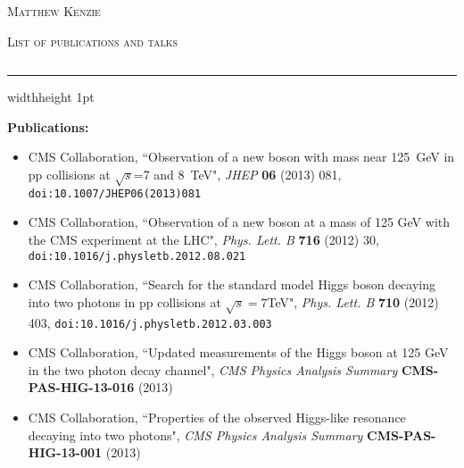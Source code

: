 \documentclass[11pt]{article}
\begin{document}
\pagestyle{fancy}
\fancyhead{}
\renewcommand{\headrulewidth}{0pt}
\fancyfoot{}
\fancyfoot[RO]{\thepage}

  \begin{center}
    \textsc{\Large Matthew Kenzie}

    \textsc{\large List of publications and talks}

    $\;$

    \hrule width\textwidth height 1pt \smallskip %
  \end{center}

{\large \textbf{Publications:}}

\begin{itemize}[leftmargin=2cm]

\item CMS Collaboration, ``Observation of a new boson with mass near 125~GeV in pp collisions at $\sqrt{s}$=7 and 8~TeV",
\textit{JHEP} 
\textbf{06} (2013) 081, 
\texttt{\newline doi:10.1007/JHEP06(2013)081} \\

\item CMS Collaboration, ``Observation of a new boson at a mass of 125 GeV with the CMS experiment at the LHC", 
\textit{Phys. Lett. B} 
\textbf{716} (2012) 30,
\texttt{\newline doi:10.1016/j.physletb.2012.08.021} \\

\item CMS Collaboration, ``Search for the standard model Higgs boson decaying into two photons in pp collisions at $\sqrt{s}=7$TeV",
\textit{Phys. Lett. B} 
\textbf{710} (2012) 403,
\texttt{\newline doi:10.1016/j.physletb.2012.03.003} \\

\item CMS Collaboration, ``Updated measurements of the Higgs boson at 125 GeV in the two photon decay channel",
\textit{CMS Physics Analysis Summary}
\textbf{CMS-PAS-HIG-13-016} (2013) \\

\item CMS Collaboration, ``Properties of the observed Higgs-like resonance decaying into two photons",
\textit{CMS Physics Analysis Summary}
\textbf{CMS-PAS-HIG-13-001} (2013) \\

\end{itemize}
\end{document}
